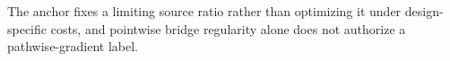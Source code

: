The anchor fixes a limiting source ratio rather than optimizing it under design-specific costs, and pointwise bridge regularity alone does not authorize a pathwise-gradient label.